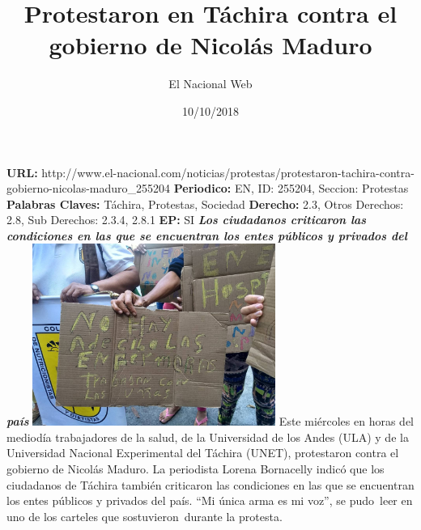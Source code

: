\documentclass{article}%
\title{\textbf{Protestaron en Táchira contra el gobierno de Nicolás Maduro}}%
\author{El Nacional Web}%
\date{10/10/2018}%
\begin{document}
%
\normalsize%
\maketitle%
\textbf{URL: }%
http://www.el{-}nacional.com/noticias/protestas/protestaron{-}tachira{-}contra{-}gobierno{-}nicolas{-}maduro\_255204\newline%
%
\textbf{Periodico: }%
EN, %
ID: %
255204, %
Seccion: %
Protestas\newline%
%
\textbf{Palabras Claves: }%
Táchira, Protestas, Sociedad\newline%
%
\textbf{Derecho: }%
2.3, %
Otros Derechos: %
2.8, %
Sub Derechos: %
2.3.4, 2.8.1\newline%
%
\textbf{EP: }%
SI\newline%
\newline%
%
\textbf{\textit{Los ciudadanos criticaron las condiciones en las que se encuentran los entes públicos y privados del país}}%
\newline%
\newline%
%
\includegraphics[width=300px]{167.jpg}%
\newline%
%
Este miércoles en horas del mediodía trabajadores de la salud, de la Universidad de los Andes (ULA) y de la Universidad Nacional Experimental del Táchira (UNET), protestaron contra el gobierno de Nicolás Maduro.%
\newline%
%
La periodista Lorena Bornacelly indicó que los ciudadanos de Táchira también criticaron las condiciones en las que se encuentran los entes públicos y privados del país.%
\newline%
%
“Mi única arma es mi voz”, se pudo~leer en uno de los carteles que sostuvieron~durante la protesta.%
\newline%
%
\end{document}
